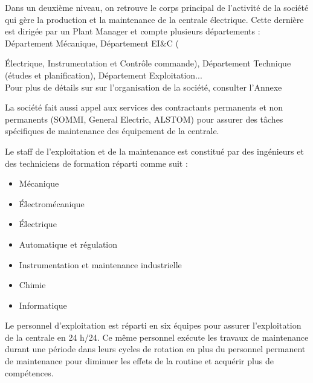 Dans un deuxième niveau, on retrouve le corps principal de l'activité de la société qui gère la production et la maintenance de la centrale électrique. Cette dernière est dirigée par un Plant Manager  et compte plusieurs départements : Département Mécanique, Département EI\&C ({Électrique, Instrumentation et Contrôle commande), Département Technique (études et planification), Département Exploitation... \\
Pour plus de détails sur  sur l'organisation de la société, consulter l'Annexe \uppercase\expandafter{} 

\begin{comment}
La CPC emploie au total 70 personnes, dont un chef de centrale, deux responsables d'exploitation et de maintenance, six administrateurs.\\Le reste du staff est constitué par des ingénieurs et des techniciens de formation réparti comme suit :
\end{comment}

La société fait aussi appel aux services des contractants permanents et non permanents (SOMMI, General Electric, ALSTOM) pour assurer des tâches spécifiques de maintenance des équipement de la centrale.

Le staff de l'exploitation et de la maintenance est constitué par des ingénieurs et des techniciens de formation réparti comme suit :

\begin{itemize}
\item Mécanique
\item Électromécanique
\item Électrique 
\item Automatique et régulation 
\item Instrumentation et maintenance industrielle
\item Chimie
\item Informatique
\end{itemize}


Le personnel d'exploitation est réparti en six équipes pour assurer l'exploitation de la centrale en 24 h/24. Ce même personnel exécute les travaux de maintenance durant une période dans leurs cycles de rotation en plus du personnel permanent de maintenance pour diminuer les effets de la routine et acquérir plus de compétences. 

	\begin{comment}
	
	La CPC est organisée selon une hiérarchie horizontale où tout le monde (ou presque) s'implique lors de la réalisation d'une tâche. En effet, la maintenance est répartie sur toutes les équipes de travail, et tous les responsables s'en occupent ce qui atténue énormément la charge individuelle. 
	\end{comment}
}

